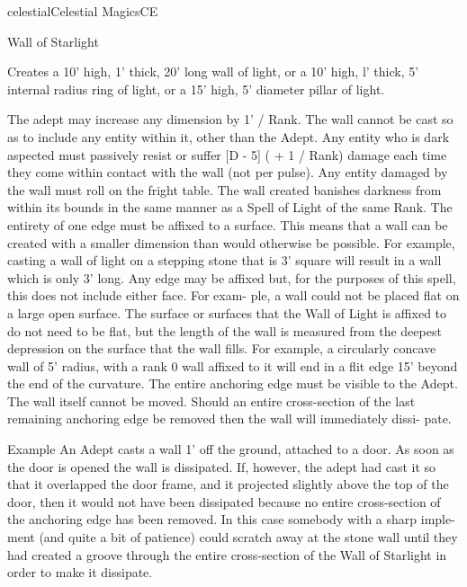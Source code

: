 \begin{College}[1.3]{celestial}{Celestial Magics}{CE}
\begin{spell}[G-5]{Wall of Starlight }

\begin{effects}
Creates a 10’ high, 1’ thick, 20’ long wall 
of  light,  or  a  10’  high,  l’  thick,  5’  internal  radius 
ring  of  light,  or  a  15’  high,  5’  diameter  pillar  of 
light. 

The  adept  may  increase  any  dimension  by  1’  / 
Rank. The wall cannot be cast so as to include any 
entity  within  it,  other  than  the  Adept.  Any  entity 
who is dark aspected must passively resist or suffer 
[D - 5] ( + 1 / Rank) damage each time they come 
within  contact  with  the  wall  (not  per  pulse).  Any 
entity  damaged by  the  wall  must  roll  on  the  fright 
table.  The  wall  created  banishes  darkness  from 
within its bounds in the same manner as a Spell of 
Light  of  the  same  Rank.  The  entirety  of  one  edge 
must be affixed to a surface. This means that a wall 
can  be  created  with  a  smaller  dimension  than 
would otherwise be possible. For  example, casting 
a wall of light on a stepping stone that is 3’ square 
will  result  in  a  wall  which  is  only  3’  long.  Any 
edge  may  be  affixed  but,  for  the  purposes  of  this 
spell,  this  does  not  include  either  face.  For  exam-
ple, a wall could not be placed flat on a large open 
surface.  The  surface  or  surfaces  that  the  Wall  of 
Light  is  affixed  to  do  not  need  to  be  flat,  but  the 
length  of  the  wall  is  measured  from  the  deepest 
depression  on  the  surface  that  the  wall  fills.  For 
example,  a  circularly  concave  wall  of  5’  radius, 
with  a  rank  0  wall  affixed  to  it  will  end  in  a  flit 
edge  15’  beyond  the  end  of  the  curvature.  The 
entire anchoring edge must be visible to the Adept. 
The  wall  itself  cannot  be  moved.  Should  an  entire 
cross-section  of  the  last  remaining  anchoring  edge 
be  removed  then  the  wall  will  immediately  dissi-
pate. 

Example 
An  Adept  casts  a  wall  1’  off  the  ground, 
attached to a door. As soon as the door is opened the wall 
is  dissipated.  If,  however,  the  adept  had  cast  it  so  that  it 
overlapped the door frame, and it projected slightly above 
the top of the door, then it would not have been dissipated 
because  no  entire  cross-section  of  the  anchoring  edge  has 
been removed. In this case somebody with a sharp imple-
ment  (and  quite  a  bit  of  patience)  could  scratch  away  at 
the stone wall until they had created a groove through the 
entire  cross-section  of  the  Wall  of  Starlight  in  order  to 
make it dissipate. 


\end{effects}
\end{spell}
\end{College}
